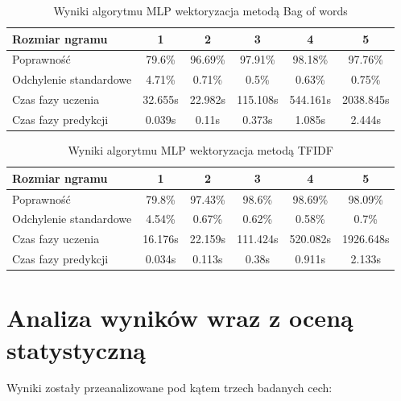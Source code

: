 \begin{table}[H]
    \centering
    \caption{Wyniki algorytmu MLP wektoryzacja metodą Bag of words}
    \begin{tabular}{ | l | c | c | c | c | c |}
        \hline
        Rozmiar ngramu & 1 & 2 & 3 & 4 & 5  \\ \hline
        Poprawność & 79.6\% & 96.69\% & 97.91\% & 98.18\% & 97.76\%   \\ \hline
        Odchylenie standardowe & 4.71\% & 0.71\% & 0.5\% & 0.63\% & 0.75\%  \\ \hline
        Czas fazy uczenia & 32.655s & 22.982s & 115.108s & 544.161s & 2038.845s  \\ \hline
        Czas fazy predykcji & 0.039s & 0.11s & 0.373s & 1.085s & 2.444s  \\ \hline
    \end{tabular}
\end{table}

\begin{table}[H]
    \centering
    \caption{Wyniki algorytmu MLP wektoryzacja metodą TFIDF}
    \begin{tabular}{ | l | c | c | c | c | c |}
        \hline
        Rozmiar ngramu & 1 & 2 & 3 & 4 & 5   \\ \hline
        Poprawność & 79.8\% & 97.43\% & 98.6\% & 98.69\% & 98.09\%   \\ \hline
        Odchylenie standardowe & 4.54\% & 0.67\% & 0.62\% & 0.58\% & 0.7\%  \\ \hline
        Czas fazy uczenia & 16.176s & 22.159s & 111.424s & 520.082s & 1926.648s  \\ \hline
        Czas fazy predykcji & 0.034s & 0.113s & 0.38s & 0.911s & 2.133s  \\ \hline
    \end{tabular}
\end{table}
\section{Analiza wyników wraz z oceną statystyczną}


Wyniki zostały przeanalizowane pod kątem trzech badanych cech:

